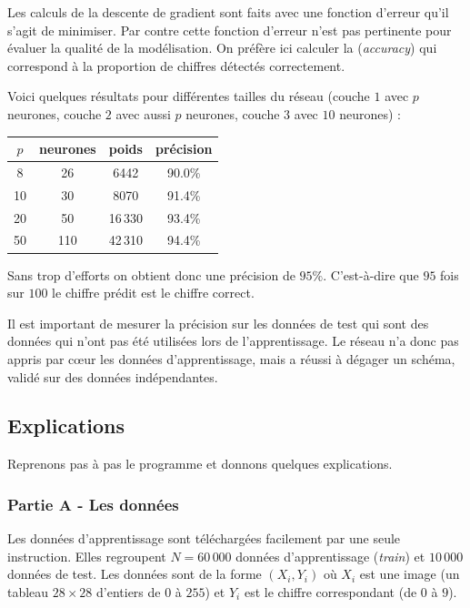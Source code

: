 \documentclass[11pt,class=report,crop=false]{standalone}
\begin{document}
Les calculs de la descente de gradient sont faits avec une fonction d'erreur qu'il s'agit de minimiser. Par contre cette fonction d'erreur n'est pas pertinente pour évaluer la qualité de la modélisation. On préfère ici calculer la  (\emph{accuracy}) qui correspond à la proportion de chiffres détectés correctement.

Voici quelques résultats pour différentes tailles du réseau (couche $1$ avec $p$ neurones, couche $2$ avec aussi $p$ neurones, couche $3$ avec $10$ neurones) :
\begin{center}
\begin{tabular}{c|c|c|c}
$p$ & {neurones} & {poids} & {précision} \\ \hline
8 & 26 & 6442 & 90.0\% \\
10 & 30 & 8070 & 91.4\% \\
20 & 50 & 16\,330 & 93.4\% \\
50 & 110 & 42\,310 & 94.4\% \\
\end{tabular}
\end{center}
Sans trop d'efforts on obtient donc une précision de $95\%$. C'est-à-dire que $95$ fois sur $100$ le chiffre prédit est le chiffre correct.

Il est important de mesurer la précision sur les données de test qui sont des données qui n'ont pas été utilisées lors de l'apprentissage. 
Le réseau n'a donc pas appris par c\oe ur les données d'apprentissage, mais a réussi à dégager un schéma, validé sur des données indépendantes.

\subsection{Explications}

Reprenons pas à pas le programme et donnons quelques explications.

\subsubsection*{Partie A - Les données}

Les données d'apprentissage sont téléchargées facilement par une seule instruction. Elles regroupent $N=60\,000$ données d'apprentissage (\emph{train}) et $10\,000$ données de test. Les données sont de la forme $(X_i,Y_i)$ où $X_i$ est une image (un tableau $28\times 28$ d'entiers de $0$ à $255$) et $Y_i$ est le chiffre correspondant (de $0$ à $9$).
\end{document}
